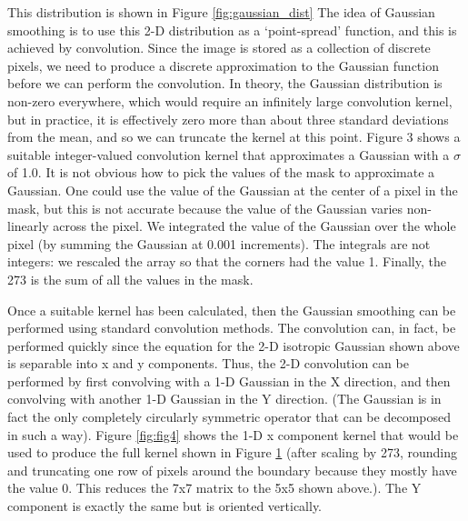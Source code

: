 This distribution is shown in Figure \ref{fig:gaussian_dist}
\bigskip
The idea of Gaussian smoothing is to use this 2-D distribution as a `point-spread' function, and this is achieved by convolution. Since the image is stored as a collection of discrete pixels, we need to produce a discrete approximation to the Gaussian function before we can perform the convolution. In theory, the Gaussian distribution is non-zero everywhere, which would require an infinitely large convolution kernel, but in practice, it is effectively zero more than about three standard deviations from the mean, and so we can truncate the kernel at this point. Figure 3 shows a suitable integer-valued convolution kernel that approximates a Gaussian with a $\sigma$ of 1.0. It is not obvious how to pick the values of the mask to approximate a Gaussian.
One could use the value of the Gaussian at the center of a pixel in the mask, but this 
is not accurate because the value of the Gaussian varies non-linearly across the pixel. We 
integrated the value of the Gaussian over the whole pixel (by summing the Gaussian at 0.001 
increments). The integrals are not integers: we rescaled the array so that the corners had the value 
1. Finally, the 273 is the sum of all the values in the mask. \bigskip

Once a suitable kernel has been calculated, then the Gaussian 
smoothing can be performed using standard convolution methods. 
The convolution can, in fact, be performed quickly since the 
equation for the 2-D isotropic Gaussian shown above is separable 
into x and y components. Thus, the 2-D convolution can be 
performed by first convolving with a 1-D Gaussian in 
the X direction, and then convolving with another 1-D Gaussian in 
the Y direction. (The Gaussian is in fact the only completely 
circularly symmetric operator that can be decomposed in such a 
way). 
Figure \ref{fig:fig4} shows the 1-D x component kernel that would be used to produce the full kernel 
shown in Figure \ref{fig:fig3} (after scaling by 273, rounding and truncating one row of pixels around the 
boundary because they mostly have the value 0. This reduces the 7x7 matrix to the 5x5 shown 
above.). The Y component is exactly the same but is oriented vertically.

\begin{figure}[h]
\begin{dBox}
\centering
  \mbox{
   }
   \label{fig:fig3}   
\end{dBox}   
\end{figure}

